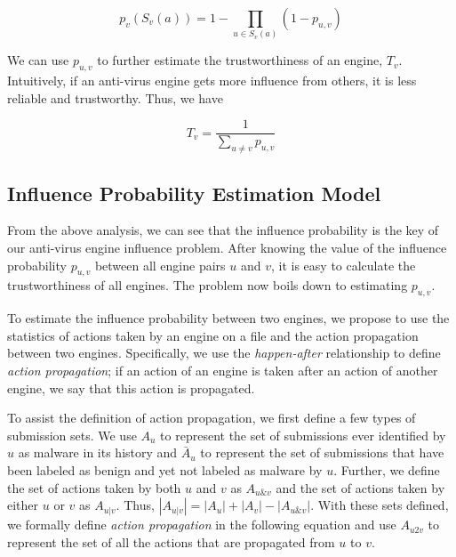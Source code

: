 \begin{equation} \label{eq:setp}
p_v(S_v(a)) = 1 - \prod\limits_{u \in S_v(a)}(1 - p_{u,v})
\end{equation}

We can use $p_{u,v}$ to further estimate the trustworthiness of an engine, $T_v$.
Intuitively, if an anti-virus engine gets more influence from others,
it is less reliable and trustworthy. Thus, we have

\begin{equation} \label{eq:trust}
T_v = \frac{1}{\sum\limits_{u \neq v}{p_{u,v}}}
\end{equation}


\subsection{Influence Probability Estimation Model}
\label{sec:influenceprob}
From the above analysis, we can see that the influence probability is the key of our anti-virus engine
influence problem.
After knowing the value of the influence probability $p_{u,v}$ between all engine pairs $u$ and $v$,
it is easy to calculate the trustworthiness of all engines.
The problem now boils down to estimating $p_{u,v}$.

To estimate the influence probability between two engines, we propose to use the statistics of actions taken by
an engine on a file and the action propagation between two engines. 
Specifically, we use the {\em happen-after} relationship to
define {\em action propagation}; if an action of an engine is taken after an action of another engine, we say that
this action is propagated.

To assist the definition of action propagation, we first define a few types of submission sets.
We use $A_u$ to represent the set of submissions ever identified by $u$ as malware in its history
and $\bar{A}_u$ to represent the set of submissions that have been labeled as benign and yet not labeled as malware by $u$.
Further, we define the set of actions taken by both $u$ and $v$ as $A_{u\&v}$ 
and the set of actions taken by either $u$ or $v$ as $A_{u|v}$.
Thus, $|A_{u|v}| =   |A_u| + |A_v| - |A_{u\&v}|$.
With these sets defined, we formally
define {\em action propagation} in the following equation 
and use $A_{u2v}$ to represent the set of all the actions that are propagated from $u$ to $v$. 

